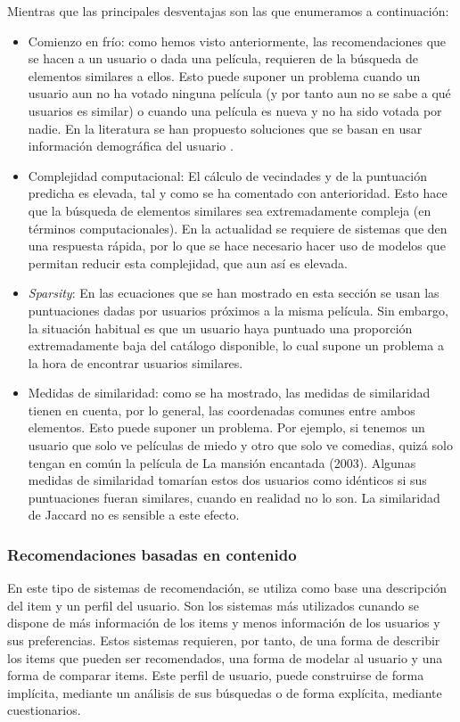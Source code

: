 Mientras que las principales desventajas son las que enumeramos a continuación:
\begin{itemize}
    \item Comienzo en frío: como hemos visto anteriormente, las recomendaciones que se hacen a un usuario o dada una película, requieren de la búsqueda de elementos similares a ellos. Esto puede suponer un problema cuando un usuario aun no ha votado ninguna película (y por tanto aun no se sabe a qué usuarios es similar) o cuando una película es nueva y no ha sido votada por nadie. En la literatura se han propuesto soluciones que se basan en usar información demográfica del usuario \cite{nguyen}.
    \item Complejidad computacional: El cálculo de vecindades y de la puntuación predicha es elevada, tal y como se ha comentado con anterioridad. Esto hace que la búsqueda de elementos similares sea extremadamente compleja (en términos computacionales). En la actualidad se requiere de sistemas que den una respuesta rápida, por lo que se hace necesario hacer uso de modelos que permitan reducir esta complejidad, que aun así es elevada.
    \item \textit{Sparsity}: En las ecuaciones que se han mostrado en esta sección se usan las puntuaciones dadas por usuarios próximos a la misma película. Sin embargo, la situación habitual es que un usuario haya puntuado una proporción extremadamente baja del catálogo disponible, lo cual supone un problema a la hora de encontrar usuarios similares.
    \item Medidas de similaridad: como se ha mostrado, las medidas de similaridad tienen en cuenta, por lo general, las coordenadas comunes entre ambos elementos. Esto puede suponer un problema. Por ejemplo, si tenemos un usuario que solo ve películas de miedo y otro que solo ve comedias, quizá solo tengan en común la película de La mansión encantada (2003). Algunas medidas de similaridad tomarían estos dos usuarios como idénticos si sus puntuaciones fueran similares, cuando en realidad no lo son. La similaridad de Jaccard no es sensible a este efecto.
\end{itemize}

\subsubsection{Recomendaciones basadas en contenido}

En este tipo de sistemas de recomendación, se utiliza como base una descripción del item y un perfil del usuario. Son los sistemas más utilizados cunando se dispone de más información de los items y menos información de los usuarios y sus preferencias. Estos sistemas requieren, por tanto, de una forma de describir los items que pueden ser recomendados, una forma de modelar al usuario y una forma de comparar items. Este perfil de usuario, puede construirse de forma implícita, mediante un análisis de sus búsquedas o de forma explícita, mediante cuestionarios.\\

